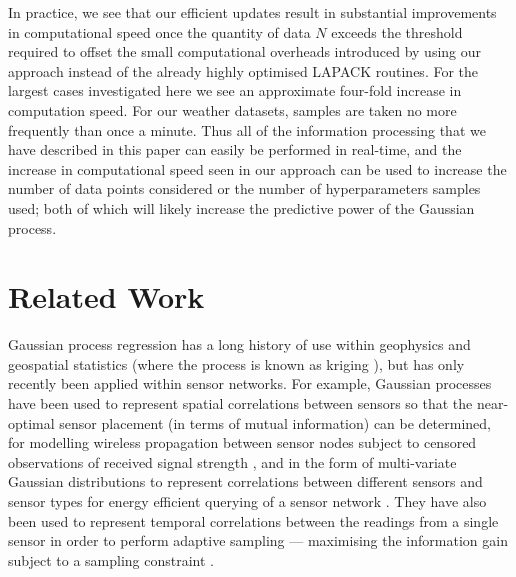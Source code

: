\documentclass{acmtrans2m}
\begin{document}
In practice, we see that our efficient updates result in substantial improvements in computational speed once the quantity of data $N$ exceeds the threshold required to offset the small computational overheads introduced by using our approach instead of the already highly optimised LAPACK routines. For the largest cases investigated here we see an approximate four-fold increase in computation speed. For our weather datasets, samples are taken no more frequently than once a minute. Thus all of the information processing that we have described in this paper can easily be performed in real-time, and the increase in computational speed seen in our approach can be used to increase the number of data points considered or the number of hyperparameters samples used; both of which will likely increase the predictive power of the Gaussian process.


\section{Related Work}\label{sec_related}

\noindent Gaussian process regression has a long history of use within geophysics and geospatial statistics (where the process is known as kriging \cite{cressie}), but has only recently been applied within sensor networks. For example, Gaussian processes have been used to represent spatial correlations between sensors so that the near-optimal sensor placement (in terms of mutual information) can be determined, for modelling wireless propagation between sensor nodes subject to censored observations of received signal strength \cite{ertin2007gpm}, and in the form of multi-variate Gaussian distributions to represent correlations between different sensors and sensor types for energy efficient querying of a sensor network \cite{guestrin2}. They have also been used to represent temporal correlations between the readings from a single sensor in order to perform adaptive sampling --- maximising the information gain subject to a sampling constraint \cite{1525857}.
\end{document}
